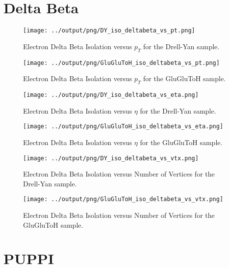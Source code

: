 \documentclass[11pt]{book}
\begin{document}
\section{Delta Beta}

\begin{figure}[htb]
\centering
\texttt{[image: ../output/png/DY\_iso\_deltabeta\_vs\_pt.png]}
\caption{Electron Delta Beta Isolation versus $p_{T}$ for the Drell-Yan sample.}
\label{fig:dy_iso_deltabeta_vs_pt}
\end{figure}

\begin{figure}[htb]
\centering
\texttt{[image: ../output/png/GluGluToH\_iso\_deltabeta\_vs\_pt.png]}
\caption{Electron Delta Beta Isolation versus $p_{T}$ for the GluGluToH sample.}
\label{fig:ggh_iso_deltabeta_vs_pt}
\end{figure}

\begin{figure}[htb]
\centering
\texttt{[image: ../output/png/DY\_iso\_deltabeta\_vs\_eta.png]}
\caption{Electron Delta Beta Isolation versus $\eta$ for the Drell-Yan sample.}
\label{fig:dy_iso_deltabeta_vs_eta}
\end{figure}

\begin{figure}[htb]
\centering
\texttt{[image: ../output/png/GluGluToH\_iso\_deltabeta\_vs\_eta.png]}
\caption{Electron Delta Beta Isolation versus $\eta$ for the GluGluToH sample.}
\label{fig:ggh_iso_deltabeta_vs_eta}
\end{figure}

\begin{figure}[htb]
\centering
\texttt{[image: ../output/png/DY\_iso\_deltabeta\_vs\_vtx.png]}
\caption{Electron Delta Beta Isolation versus Number of Vertices for the Drell-Yan sample.}
\label{fig:dy_iso_deltabeta_vs_vtx}
\end{figure}

\begin{figure}[htb]
\centering
\texttt{[image: ../output/png/GluGluToH\_iso\_deltabeta\_vs\_vtx.png]}
\caption{Electron Delta Beta Isolation versus Number of Vertices for the GluGluToH sample.}
\label{fig:ggh_iso_deltabeta_vs_vtx}
\end{figure}
\clearpage

\section{PUPPI}
\end{document}
